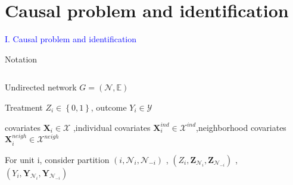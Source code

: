 \documentclass[notes,11pt, aspectratio=169]{beamer}
\begin{document}
\section{Causal problem and identification}
\begin{transitionframe}
  \begin{center}
    { \Huge \textcolor{blue}{I. Causal problem and identification}}
  \end{center}
\end{transitionframe}






\begin{frame}{Notation}
\begin{columns}[T] %
\begin{column}{.8\textwidth}
  \begin{wideitemize}
  \item  Undirected network $G=(\mathcal{N},\mathbb{E})$
  \item  Treatment $Z_i \in \left\{0,1\right\}$,  outcome $Y_i \in \mathcal{Y}$
  \item  covariates $ \mathbf{X}_i \in \mathcal{X}$ ,individual covariates $\mathbf{X}_{i}^{ind} \in \mathcal{X}^{ind}$,neighborhood covariates $\mathbf{X}_{i}^{neigh} \in \mathcal{X}^{neigh}$
  \item  For unit i, consider partition $(i,\mathcal{N}_i,\mathcal{N}_{-i})$ , $(Z_i , \mathbf{Z}_{\mathcal{N}_i},\mathbf{Z}_{\mathcal{N}_{-i}})$ , $(Y_i , \mathbf{Y}_{\mathcal{N}_i},\mathbf{Y}_{\mathcal{N}_{-i}})$ 
  \end{wideitemize}
\end{column}%
\hfill%
\begin{column}{.38\textwidth}
\end{column}%
\end{columns}
\end{frame}
\end{document}
